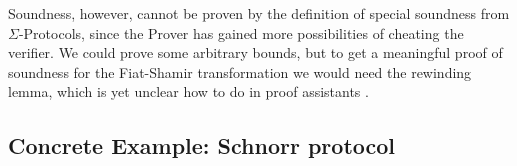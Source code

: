 Soundness, however, cannot be proven by the definition of special soundness from
$\Sigma$-Protocols, since the Prover has gained more possibilities of cheating
the verifier. We could prove some arbitrary bounds, but to get a meaningful
proof of soundness for the Fiat-Shamir transformation we would need the
rewinding lemma, which is yet unclear how to do in proof assistants
.

\subsection{Concrete Example: Schnorr protocol}
\label{subsec:schnorr}




